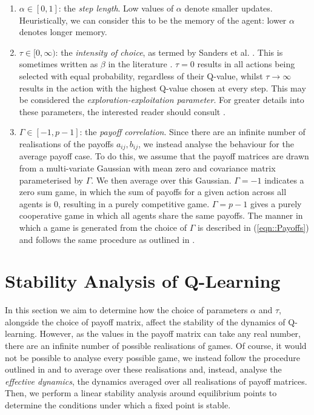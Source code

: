 \documentclass[sigconf,anonymous]{aamas}
\begin{document}
\begin{enumerate}
    \item $\alpha \in [0, 1]$: the \textit{step length}. Low values of $\alpha$ denote smaller
    updates. Heuristically, we can consider this to be the memory of the agent: lower $\alpha$
    denotes longer memory.
    \item $\tau \in [0, \infty)$: the \textit{intensity of choice}, as termed by Sanders et al. 
    \cite{Sanders2018}. This is sometimes written as $\beta$ in the literature \cite{Sutton2018}.
    $\tau = 0$ results in all actions being selected with equal probability, regardless of their
    Q-value, whilst $\tau \rightarrow \infty$ results in the action with the highest Q-value chosen
    at every step. This may be considered the \textit{exploration-exploitation parameter}. For greater
    details into these parameters, the interested reader should consult \cite{Sutton2018}.
    \item $\Gamma \in [-1, p-1]$: the \textit{payoff correlation}. Since there are an infinite number of realisations of the payoffs $a_{ij}, b_{ij}$, we instead analyse the behaviour for the average payoff case. To do this, we assume that the payoff matrices are drawn from a multi-variate Gaussian with mean zero and
    covariance matrix parameterised by $\Gamma$. We then average over this Gaussian. $\Gamma = -1$ indicates a zero
    sum game, in which the sum of payoffs for a given action across all agents is 0, resulting in a
    purely competitive game. $\Gamma = p-1$ gives a purely cooperative game in which all agents
    share the same payoffs. The manner in which a game is generated from the choice of $\Gamma$ is
    described in (\ref{eqn::Payoffs}) and follows the same procedure as outlined in \cite{Sanders2018}.
\end{enumerate}


\section{Stability Analysis of Q-Learning} \label{sec::Theory}

In this section we aim to determine how the choice of parameters $\alpha$ and $\tau$, alongside the choice of payoff matrix, affect the stability of the dynamics of Q-learning. However, as the values in the payoff matrix can take any real number, there are an infinite number of possible realisations of games. Of course, it would not be possible to analyse every possible game, we instead follow the procedure outlined in \cite{Coolen2005} and \cite{Galla2013} to average over these realisations and, instead, analyse the \textit{effective dynamics}, the dynamics averaged over all realisations of payoff matrices. Then, we perform a linear stability analysis around equilibrium points to determine the conditions under which a fixed point is stable.
\end{document}
